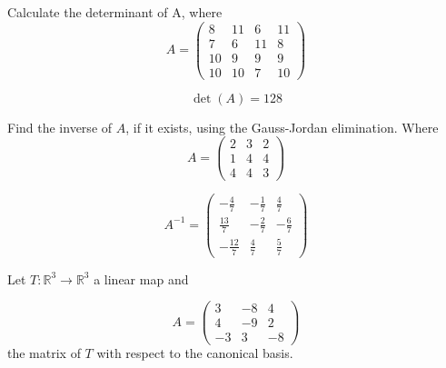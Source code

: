 \begin{questions}

\question Calculate the determinant of A, where
$$
A=\left(\begin{array}{rrrr}
8 & 11 & 6 & 11 \\
7 & 6 & 11 & 8 \\
10 & 9 & 9 & 9 \\
10 & 10 & 7 & 10
\end{array}\right)
$$

\begin{solution}
$$\det(A)=128$$
\end{solution}

\question Find the inverse of $A$, if it exists, using the Gauss-Jordan elimination. Where
$$
A=\left(\begin{array}{rrr}
2 & 3 & 2 \\
1 & 4 & 4 \\
4 & 4 & 3
\end{array}\right)
$$

\begin{solution}
$$A^{-1}=\left(\begin{array}{rrr}
-\frac{4}{7} & -\frac{1}{7} & \frac{4}{7} \\
\frac{13}{7} & -\frac{2}{7} & -\frac{6}{7} \\
-\frac{12}{7} & \frac{4}{7} & \frac{5}{7}
\end{array}\right)$$
\end{solution}

\question Let $T:\mathbb{R}^3\rightarrow\mathbb{R}^3$  a linear map and
 
$$
A=\left(\begin{array}{rrr}
3 & -8 & 4 \\
4 & -9 & 2 \\
-3 & 3 & -8
\end{array}\right)
$$
the matrix of $T$ with respect to the canonical basis.
\end{questions}
